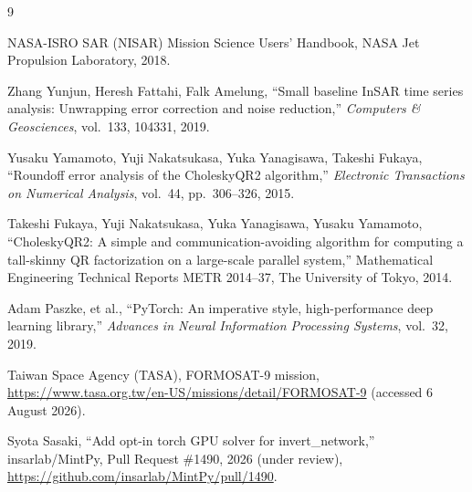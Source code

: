 \documentclass[a4paper]{article}
\begin{document}
\begin{thebibliography}{9}

  NASA-ISRO SAR (NISAR) Mission Science Users' Handbook,
  NASA Jet Propulsion Laboratory, 2018.

  Zhang Yunjun, Heresh Fattahi, Falk Amelung,
  ``Small baseline InSAR time series analysis:
  Unwrapping error correction and noise reduction,''
  \textit{Computers \& Geosciences}, vol.~133, 104331, 2019.

  Yusaku Yamamoto, Yuji Nakatsukasa, Yuka Yanagisawa, Takeshi Fukaya,
  ``Roundoff error analysis of the CholeskyQR2 algorithm,''
  \textit{Electronic Transactions on Numerical Analysis},
  vol.~44, pp.~306--326, 2015.

  Takeshi Fukaya, Yuji Nakatsukasa, Yuka Yanagisawa, Yusaku Yamamoto,
  ``CholeskyQR2: A simple and communication-avoiding algorithm for computing
  a tall-skinny QR factorization on a large-scale parallel system,''
  Mathematical Engineering Technical Reports METR 2014--37,
  The University of Tokyo, 2014.

  Adam Paszke, et al.,
  ``PyTorch: An imperative style, high-performance deep learning library,''
  \textit{Advances in Neural Information Processing Systems}, vol.~32, 2019.

  Taiwan Space Agency (TASA), FORMOSAT-9 mission,
  \url{https://www.tasa.org.tw/en-US/missions/detail/FORMOSAT-9}
  (accessed 6 August 2026).

  Syota Sasaki,
  ``Add opt-in torch GPU solver for invert\_network,''
  insarlab/MintPy, Pull Request \#1490, 2026 (under review),
  \url{https://github.com/insarlab/MintPy/pull/1490}.

\end{thebibliography}
\end{document}

